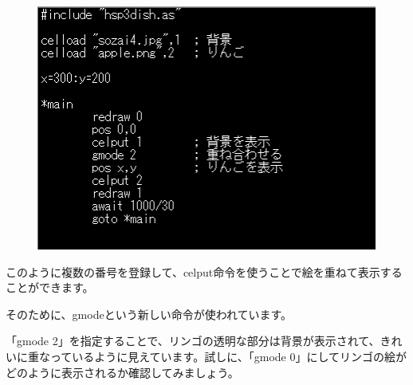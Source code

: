 \begin{figure}[H]
    \begin{center}
      \includegraphics[keepaspectratio,width=11.245cm,height=8.07cm]{text04-img/s_applehspsrc.png}
    \end{center}
    \label{fig:prog_menu}
\end{figure}

このように複数の番号を登録して、celput命令を使うことで絵を重ねて表示することができます。

そのために、gmodeという新しい命令が使われています。


\begin{description}
    \item {}
\end{description}


\begin{description}
    \item {}
    \item {}
    \item {}
    \item {}
    \item {}
    \item {}
\end{description}

「gmode 2」を指定することで、リンゴの透明な部分は背景が表示されて、きれいに重なっているように見えています。試しに、「gmode 0」にしてリンゴの絵がどのように表示されるか確認してみましょう。

